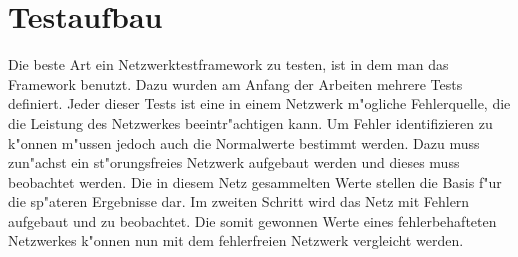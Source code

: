 \chapter{Testaufbau}
\label{cha:testaufbau}
Die beste Art ein Netzwerktestframework zu testen, ist in dem man das Framework benutzt. %
Dazu wurden am Anfang der Arbeiten mehrere Tests definiert. Jeder dieser Tests %
ist eine in einem Netzwerk m"ogliche Fehlerquelle, die die Leistung des Netzwerkes %
beeintr"achtigen kann. Um Fehler identifizieren %
zu k"onnen m"ussen jedoch auch die Normalwerte bestimmt werden. Dazu muss zun"achst ein %
st"orungsfreies Netzwerk aufgebaut werden und dieses muss beobachtet werden. %
Die in diesem Netz gesammelten Werte stellen die Basis f"ur die sp"ateren Ergebnisse dar. %
Im zweiten Schritt wird das Netz mit Fehlern aufgebaut und zu beobachtet. Die somit %
gewonnen Werte eines fehlerbehafteten Netzwerkes k"onnen nun mit dem %
fehlerfreien Netzwerk vergleicht werden.  

